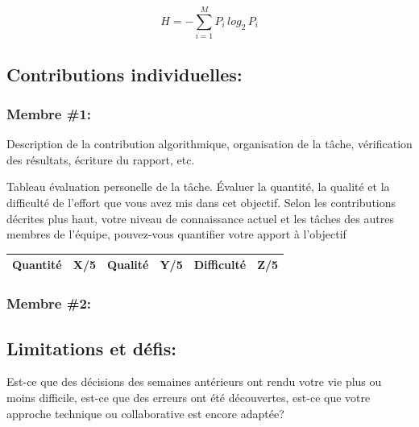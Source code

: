 \documentclass{article}
\begin{document}
$$H=-\sum_{i=1}^{M} P_i\,log_2\,P_i$$

\subsection{Contributions individuelles:}
\subsubsection*{Membre \#1:} Description de la contribution algorithmique, organisation de la tâche, vérification des résultats, écriture du rapport, etc.

Tableau évaluation personelle de la tâche. Évaluer la quantité, la qualité et la difficulté de l'effort que vous avez mis dans cet objectif. Selon les contributions décrites plus haut, votre niveau de connaissance actuel et les tâches des autres membres de l'équipe, pouvez-vous quantifier votre apport à l'objectif
\begin{center}
\begin{tabular}{ |cc|cc|cc| } 
 \hline
 Quantité & X/5 & Qualité & Y/5 & Difficulté & Z/5 \\ 
 \hline
\end{tabular}
\end{center}

\subsubsection*{Membre \#2:}

\subsection{Limitations et défis:}
Est-ce que des décisions des semaines antérieurs ont rendu votre vie plus ou moins difficile, est-ce que des erreurs ont été découvertes, est-ce que votre approche technique ou collaborative est encore adaptée?



\end{document}
